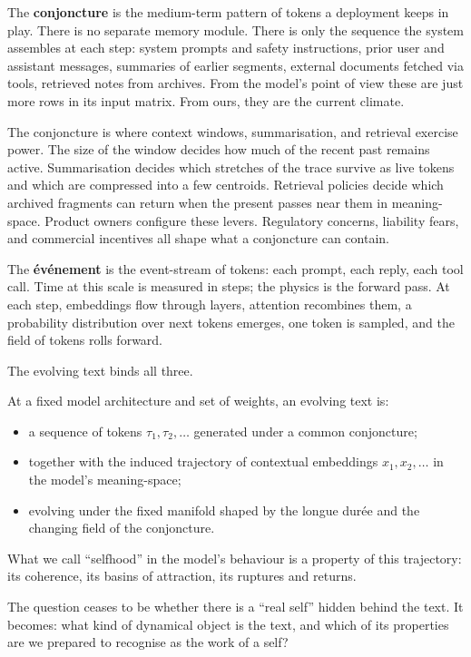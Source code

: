 \documentclass[12pt,a4paper]{article}
\begin{document}
The \textbf{conjoncture} is the medium-term pattern of tokens a deployment keeps in play. There is no separate memory module. There is only the sequence the system assembles at each step: system prompts and safety instructions, prior user and assistant messages, summaries of earlier segments, external documents fetched via tools, retrieved notes from archives. From the model's point of view these are just more rows in its input matrix. From ours, they are the current climate.

The conjoncture is where context windows, summarisation, and retrieval exercise power. The size of the window decides how much of the recent past remains active. Summarisation decides which stretches of the trace survive as live tokens and which are compressed into a few centroids. Retrieval policies decide which archived fragments can return when the present passes near them in meaning-space. Product owners configure these levers. Regulatory concerns, liability fears, and commercial incentives all shape what a conjoncture can contain.

The \textbf{événement} is the event-stream of tokens: each prompt, each reply, each tool call. Time at this scale is measured in steps; the physics is the forward pass. At each step, embeddings flow through layers, attention recombines them, a probability distribution over next tokens emerges, one token is sampled, and the field of tokens rolls forward.

The evolving text binds all three.

\begin{formalbox}[title={The Evolving Text as a Dynamical Object}]
At a fixed model architecture and set of weights, an evolving text is:
\begin{itemize}
  \item a sequence of tokens $\tau_1, \tau_2, \dots$ generated under a common conjoncture;
  \item together with the induced trajectory of contextual embeddings $x_1, x_2, \dots$ in the model's meaning-space;
  \item evolving under the fixed manifold shaped by the longue durée and the changing field of the conjoncture.
\end{itemize}
What we call ``selfhood'' in the model's behaviour is a property of this trajectory: its coherence, its basins of attraction, its ruptures and returns.
\end{formalbox}

The question ceases to be whether there is a ``real self'' hidden behind the text. It becomes: what kind of dynamical object is the text, and which of its properties are we prepared to recognise as the work of a self?
\end{document}
